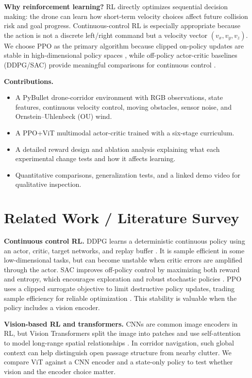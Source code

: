 \documentclass[twocolumn,a4paper,10pt]{article}
\begin{document}
\textbf{Why reinforcement learning?}
RL directly optimizes sequential decision making: the drone can learn how
short-term velocity choices affect future collision risk and goal progress.
Continuous-control RL is especially appropriate because the action is not a
discrete left/right command but a velocity vector $(v_x,v_y,v_z)$.  We choose
PPO as the primary algorithm because clipped on-policy updates are stable in
high-dimensional policy spaces \cite{schulman2017ppo}, while off-policy
actor-critic baselines (DDPG/SAC) provide meaningful comparisons for
continuous control \cite{lillicrap2015ddpg,haarnoja2018sac}.

\textbf{Contributions.}
\begin{itemize}
  \item A PyBullet drone-corridor environment with RGB observations, state
  features, continuous velocity control, moving obstacles, sensor noise, and
  Ornstein--Uhlenbeck (OU) wind.
  \item A PPO+ViT multimodal actor-critic trained with a six-stage curriculum.
  \item A detailed reward design and ablation analysis explaining what each
  experimental change tests and how it affects learning.
  \item Quantitative comparisons, generalization tests, and a linked demo
  video for qualitative inspection.
\end{itemize}

\section{Related Work / Literature Survey}

\textbf{Continuous control RL.}
DDPG learns a deterministic continuous policy using an actor, critic, target
networks, and replay buffer \cite{lillicrap2015ddpg}.  It is sample efficient
in some low-dimensional tasks, but can become unstable when critic errors are
amplified through the actor.  SAC improves off-policy control by maximizing
both reward and entropy, which encourages exploration and robust stochastic
policies \cite{haarnoja2018sac}.  PPO uses a clipped surrogate objective to
limit destructive policy updates, trading sample efficiency for reliable
optimization \cite{schulman2017ppo}.  This stability is valuable when the
policy includes a vision encoder.

\textbf{Vision-based RL and transformers.}
CNNs are common image encoders in RL, but Vision Transformers split the image
into patches and use self-attention to model long-range spatial relationships
\cite{dosovitskiy2020vit}.  In corridor navigation, such global context can
help distinguish open passage structure from nearby clutter.  We compare ViT
against a CNN encoder and a state-only policy to test whether vision and the
encoder choice matter.
\end{document}
